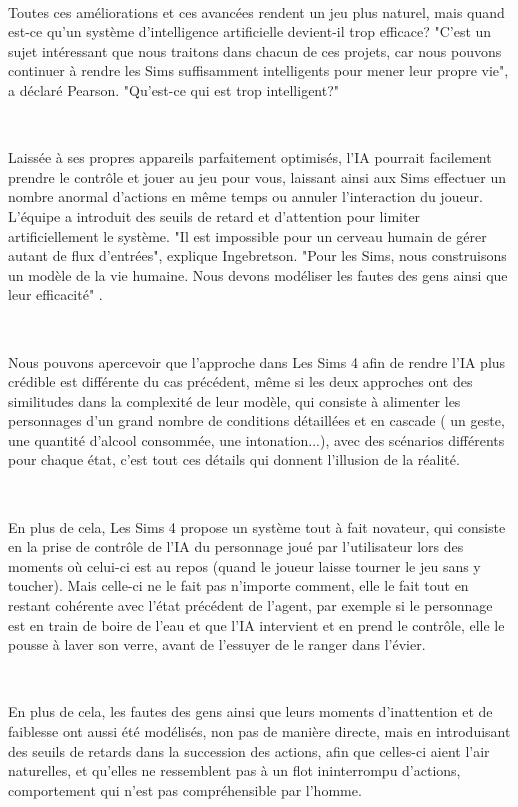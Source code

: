 ~\par
Toutes ces améliorations et ces avancées rendent un jeu plus naturel, mais quand est-ce qu’un système d'intelligence artificielle devient-il trop efficace? "C'est un sujet intéressant que nous traitons dans chacun de ces projets, car nous pouvons continuer à rendre les Sims suffisamment intelligents pour mener leur propre vie", a déclaré Pearson. "Qu'est-ce qui est trop intelligent?"

~\par

Laissée à ses propres appareils parfaitement optimisés, l'IA pourrait facilement prendre le contrôle et jouer au jeu pour vous, laissant ainsi aux Sims effectuer un nombre anormal d'actions en même temps ou annuler l'interaction du joueur. L’équipe a introduit des seuils de retard et d’attention pour limiter artificiellement le système. "Il est impossible pour un cerveau humain de gérer autant de flux d'entrées", explique Ingebretson. "Pour les Sims, nous construisons un modèle de la vie humaine. Nous devons modéliser les fautes des gens ainsi que leur efficacité" \parencite{simsArticle}. 

~\par
Nous pouvons apercevoir que l'approche dans Les Sims 4 afin de rendre l’IA plus crédible est différente du cas précédent, même si les deux approches ont des similitudes dans la complexité de leur modèle, qui consiste à alimenter les personnages d’un grand nombre de conditions détaillées et en cascade ( un geste, une quantité d’alcool consommée, une intonation...), avec des scénarios différents pour chaque état, c’est tout ces détails qui donnent l’illusion de la réalité.

~\par
En plus de cela, Les Sims 4 propose un système tout à fait novateur, qui consiste en la prise de contrôle de l’IA du personnage joué par l’utilisateur lors des moments où celui-ci est au repos (quand le joueur laisse tourner le jeu sans y toucher). Mais celle-ci ne le fait pas n’importe comment, elle le fait tout en restant cohérente avec l’état précédent de l’agent, par exemple si le personnage est en train de boire de l’eau et que l’IA intervient et en prend le contrôle, elle le pousse à laver son verre, avant de l'essuyer de le ranger dans l’évier.

~\par
En plus de cela, les fautes des gens ainsi que leurs moments d'inattention et de faiblesse ont aussi été modélisés, non pas de manière directe, mais en introduisant des seuils de retards dans la succession des actions, afin que celles-ci aient l’air naturelles, et qu’elles ne ressemblent pas à un flot ininterrompu d’actions, comportement  qui n’est pas compréhensible par l’homme.
